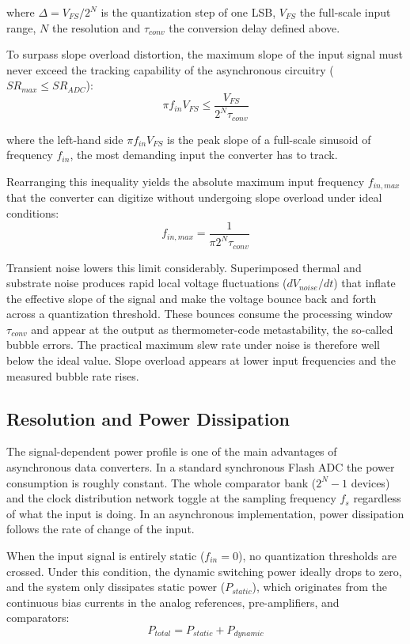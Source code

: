 \noindent
where $\Delta = V_{FS}/2^N$ is the quantization step of one LSB, $V_{FS}$ the full-scale input range, $N$ the resolution and $\tau_{conv}$ the conversion delay defined above.

To surpass slope overload distortion, the maximum slope of the input signal must never exceed the tracking capability of the asynchronous circuitry ($SR_{max} \le SR_{ADC}$):
\begin{equation}
    \pi f_{in} V_{FS} \le \frac{V_{FS}}{2^N \tau_{conv}}
\end{equation}

\noindent
where the left-hand side $\pi f_{in} V_{FS}$ is the peak slope of a full-scale sinusoid of frequency $f_{in}$, the most demanding input the converter has to track.

Rearranging this inequality yields the absolute maximum input frequency $f_{in,max}$ that the converter can digitize without undergoing slope overload under ideal conditions:
\begin{equation}
    f_{in,max} = \frac{1}{\pi 2^N \tau_{conv}}
\end{equation}

Transient noise lowers this limit considerably. Superimposed thermal and substrate noise produces rapid local voltage fluctuations ($dV_{noise}/dt$) that inflate the effective slope of the signal and make the voltage bounce back and forth across a quantization threshold. These bounces consume the processing window $\tau_{conv}$ and appear at the output as thermometer-code metastability, the so-called bubble errors. The practical maximum slew rate under noise is therefore well below the ideal value. Slope overload appears at lower input frequencies and the measured bubble rate rises.

\subsection{Resolution and Power Dissipation}
\label{subsec:resolution_power}

The signal-dependent power profile is one of the main advantages of asynchronous data converters. In a standard synchronous Flash ADC the power consumption is roughly constant. The whole comparator bank ($2^N - 1$ devices) and the clock distribution network toggle at the sampling frequency $f_s$ regardless of what the input is doing. In an asynchronous implementation, power dissipation follows the rate of change of the input.

When the input signal is entirely static ($f_{in} = 0$), no quantization thresholds are crossed. Under this condition, the dynamic switching power ideally drops to zero, and the system only dissipates static power ($P_{static}$), which originates from the continuous bias currents in the analog references, pre-amplifiers, and comparators:
\begin{equation}
    P_{total} = P_{static} + P_{dynamic}
\end{equation}

